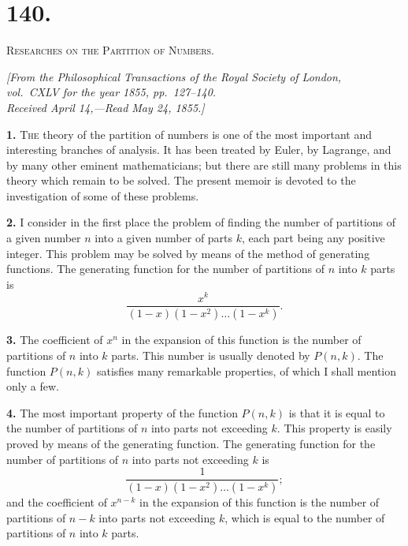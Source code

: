 \documentclass[12pt,a4paper]{article}
\begin{document}
\newpage
\setcounter{page}{234}


\section*{140.}

\textsc{Researches on the Partition of Numbers.}

\begin{flushright}
\textit{[From the Philosophical Transactions of the Royal Society of London,}\\
\textit{vol.\ CXLV for the year 1855, pp.\ 127--140.}\\
\textit{Received April 14,---Read May 24, 1855.]}
\end{flushright}

\textbf{1.} \textsc{The} theory of the partition of numbers is one of the most important and interesting branches of analysis. It has been treated by Euler, by Lagrange, and by many other eminent mathematicians; but there are still many problems in this theory which remain to be solved. The present memoir is devoted to the investigation of some of these problems.

\textbf{2.} I consider in the first place the problem of finding the number of partitions of a given number $n$ into a given number of parts $k$, each part being any positive integer. This problem may be solved by means of the method of generating functions. The generating function for the number of partitions of $n$ into $k$ parts is
\[
\frac{x^k}{(1-x)(1-x^2)\ldots(1-x^k)}.
\]

\newpage
\setcounter{page}{235}

\textbf{3.} The coefficient of $x^n$ in the expansion of this function is the number of partitions of $n$ into $k$ parts. This number is usually denoted by $P(n, k)$. The function $P(n, k)$ satisfies many remarkable properties, of which I shall mention only a few.

\textbf{4.} The most important property of the function $P(n, k)$ is that it is equal to the number of partitions of $n$ into parts not exceeding $k$. This property is easily proved by means of the generating function. The generating function for the number of partitions of $n$ into parts not exceeding $k$ is
\[
\frac{1}{(1-x)(1-x^2)\ldots(1-x^k)};
\]
and the coefficient of $x^{n-k}$ in the expansion of this function is the number of partitions of $n-k$ into parts not exceeding $k$, which is equal to the number of partitions of $n$ into $k$ parts.
\end{document}
